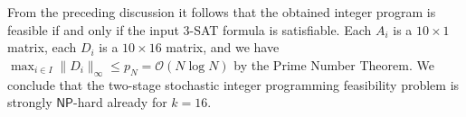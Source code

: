 \documentclass{article}
\renewcommand{\leq}{\leqslant}
\newcommand{\Oh}{{\mathcal{O}}}
\begin{document}
From the preceding discussion it follows that the obtained integer program is feasible if and only if the input 3-SAT formula is satisfiable. Each $A_i$ is a $10 \times 1$ matrix, each $D_i$ is a $10 \times 16$ matrix, and we have $\max_{i\in I} \|D_i\|_\infty \leq p_N = \Oh(N \log N)$ by the Prime Number Theorem. We conclude that the two-stage stochastic integer programming feasibility problem is strongly $\mathsf{NP}$-hard already for $k=16$.
\end{document}
